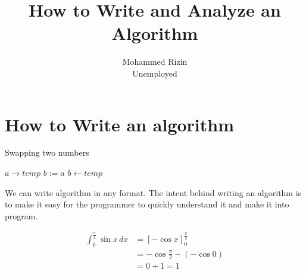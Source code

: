 \documentclass[twocolumn]{article}
\title{How to Write and Analyze an Algorithm}
\author{Mohammed Rizin \\ Unemployed}
\begin{document}
\maketitle

\section{How to Write an algorithm}
\noindent
\begin{algorithm}
\caption{Swapping two numbers}\label{swap}
\begin{algorithmic}
\State$a \rightarrow temp$
\State$b := a$
\State$b \gets temp$
\EndProcedure{}
\end{algorithmic}
\end{algorithm}

We can write algorithm in any format. The intent behind writing an algorithm is to make it easy for the programmer to quickly understand it and make it into program.



\[
\begin{aligned}
\int_{0}^{\frac{\pi}{2}} \sin{x}\,dx &= \left[-\cos{x}\right]_{0}^{\frac{\pi}{2}} \\
&= -\cos{\frac{\pi}{2}} - (-\cos{0}) \\
&= 0 + 1 = 1
\end{aligned}
\tag{2}
\]
\end{document}
